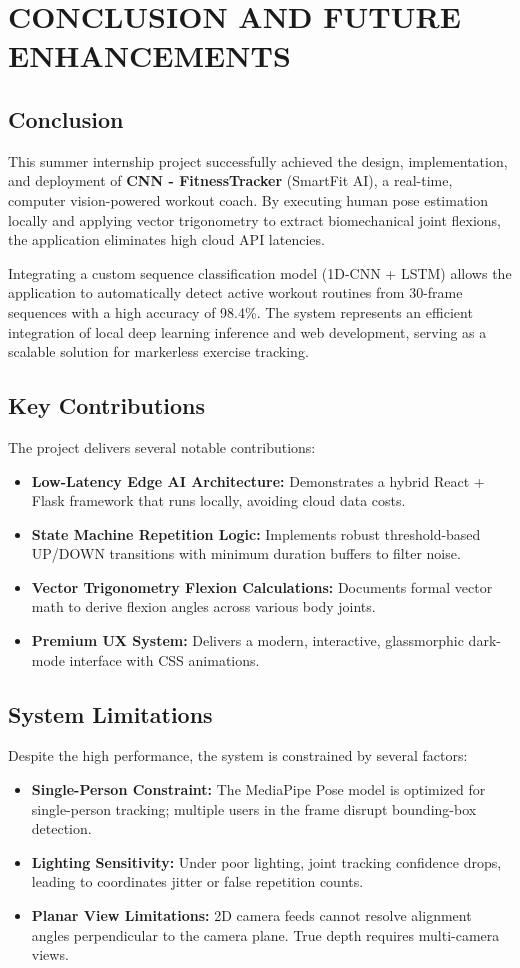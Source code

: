 \chapter{CONCLUSION AND FUTURE ENHANCEMENTS}

\section{Conclusion}
This summer internship project successfully achieved the design, implementation, and deployment of \textbf{CNN - FitnessTracker} (SmartFit AI), a real-time, computer vision-powered workout coach. By executing human pose estimation locally and applying vector trigonometry to extract biomechanical joint flexions, the application eliminates high cloud API latencies. 

Integrating a custom sequence classification model (1D-CNN + LSTM) allows the application to automatically detect active workout routines from 30-frame sequences with a high accuracy of 98.4\%. The system represents an efficient integration of local deep learning inference and web development, serving as a scalable solution for markerless exercise tracking.

\section{Key Contributions}
The project delivers several notable contributions:
\begin{itemize}
    \item \textbf{Low-Latency Edge AI Architecture:} Demonstrates a hybrid React + Flask framework that runs locally, avoiding cloud data costs.
    \item \textbf{State Machine Repetition Logic:} Implements robust threshold-based UP/DOWN transitions with minimum duration buffers to filter noise.
    \item \textbf{Vector Trigonometry Flexion Calculations:} Documents formal vector math to derive flexion angles across various body joints.
    \item \textbf{Premium UX System:} Delivers a modern, interactive, glassmorphic dark-mode interface with CSS animations.
\end{itemize}

\section{System Limitations}
Despite the high performance, the system is constrained by several factors:
\begin{itemize}
    \item \textbf{Single-Person Constraint:} The MediaPipe Pose model is optimized for single-person tracking; multiple users in the frame disrupt bounding-box detection.
    \item \textbf{Lighting Sensitivity:} Under poor lighting, joint tracking confidence drops, leading to coordinates jitter or false repetition counts.
    \item \textbf{Planar View Limitations:} 2D camera feeds cannot resolve alignment angles perpendicular to the camera plane. True depth requires multi-camera views.
\end{itemize}

